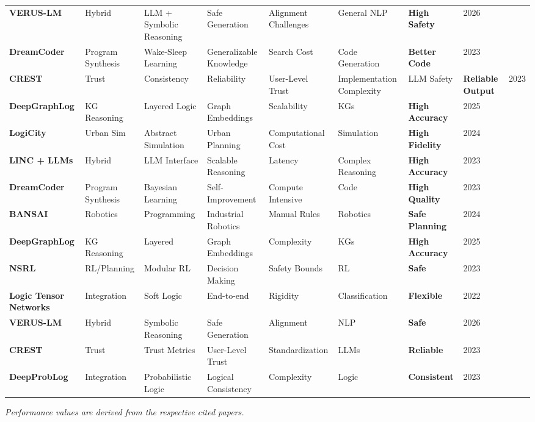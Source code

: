 \documentclass{article}
\begin{document}
\begin{table}[ht]
{\begin{tabular}{llllllll}
\textbf{VERUS-LM} & Hybrid & LLM + Symbolic Reasoning & Safe Generation & Alignment Challenges & General NLP & \textbf{High Safety} & 2026 \\
\textbf{DreamCoder} & Program Synthesis & Wake-Sleep Learning & Generalizable Knowledge & Search Cost & Code Generation & \textbf{Better Code} & 2023 \\
\textbf{CREST} & Trust & Consistency & Reliability & User-Level Trust & Implementation Complexity & LLM Safety & \textbf{Reliable Output} & 2023 \\
\textbf{DeepGraphLog} & KG Reasoning & Layered Logic & Graph Embeddings & Scalability & KGs & \textbf{High Accuracy} & 2025 \\
\textbf{LogiCity} & Urban Sim & Abstract Simulation & Urban Planning & Computational Cost & Simulation & \textbf{High Fidelity} & 2024 \\
\textbf{LINC + LLMs} & Hybrid & LLM Interface & Scalable Reasoning & Latency & Complex Reasoning & \textbf{High Accuracy} & 2023 \\
\textbf{DreamCoder} & Program Synthesis & Bayesian Learning & Self-Improvement & Compute Intensive & Code & \textbf{High Quality} & 2023 \\
\textbf{BANSAI} & Robotics & Programming & Industrial Robotics & Manual Rules & Robotics & \textbf{Safe Planning} & 2024 \\
\textbf{DeepGraphLog} & KG Reasoning & Layered & Graph Embeddings & Complexity & KGs & \textbf{High Accuracy} & 2025 \\
\textbf{NSRL} & RL/Planning & Modular RL & Decision Making & Safety Bounds & RL & \textbf{Safe} & 2023 \\
\textbf{Logic Tensor Networks} & Integration & Soft Logic & End-to-end & Rigidity & Classification & \textbf{Flexible} & 2022 \\
\textbf{VERUS-LM} & Hybrid & Symbolic Reasoning & Safe Generation & Alignment & NLP & \textbf{Safe} & 2026 \\
\textbf{CREST} & Trust & Trust Metrics & User-Level Trust & Standardization & LLMs & \textbf{Reliable} & 2023 \\
\textbf{DeepProbLog} & Integration & Probabilistic Logic & Logical Consistency & Complexity & Logic & \textbf{Consistent} & 2023 \\
\bottomrule
\end{tabular}
}
\end{table}

\textit{Performance values are derived from the respective cited papers.}
\end{document}
